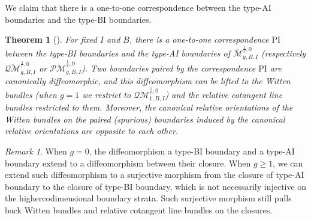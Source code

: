 \documentclass[11pt]{amsart}
\newtheorem{thm}[dummy]{Theorem}
\theoremstyle{definition}
\theoremstyle{remark}
\newtheorem{rmk}[dummy]{Remark}
\newcommand{\oPMb}{{\overline{\mathcal{PM}}}}
\newcommand{\oQMb}{{\overline{\mathcal{QM}}}}
\newcommand{\<}{\left<}
\renewcommand{\>}{\right>}
\numberwithin{equation}{section}
\def\Mbar{{\overline{\mathcal M}}}
\def\PI{{\text{PI}}}
\def\PI{\text{PI}}
\begin{document}
We %
claim that there %
is a one-to-one %
correspondence between the type-AI boundaries and the type-BI boundaries.



    \begin{thm}[{\cite[Theorem 4.12]{TZ1}}]\label{thm  PI boundaries paried}
 For fixed $I$ and $B$, there is a one-to-one correspondence $\PI$ between the type-BI boundaries and the type-AI boundaries of $\Mbar^{\frac{1}{r},0}_{g,B,I}$ (respectively $\oQMb^{\frac{1}{r},0}_{g,B,I}$ or $\oPMb^{\frac{1}{r},0}_{g,B,I}$). Two boundaries paired by the correspondence $\PI$ are canonically diffeomorphic, and this diffeomorphism can be lifted to the Witten bundles (when $g=1$ we restrict to $\oQMb^{\frac{1}{r},0}_{1,B,I}$) and the relative cotangent line bundles restricted to them. Moreover, the canonical relative orientations of the Witten bundles on the paired (spurious) boundaries induced by the canonical relative orientations are opposite to each other. 
 \end{thm}

 \begin{rmk}\label{rmk non injective in PI g>0}
     When $g=0$, the diffeomorphism a type-BI boundary and a type-AI boundary extend to a diffeomorphism between their closure. When $g\ge 1$, we can extend such diffeomorphism to a surjective morphism from the closure of type-AI boundary to the closure of type-BI boundary, which is %
not necessarily injective %
on %
the highercodimensional boundary %
strata. Such surjective morphism still pulls back Witten bundles and relative cotangent line bundles on the closures.
 \end{rmk}
\end{document}
